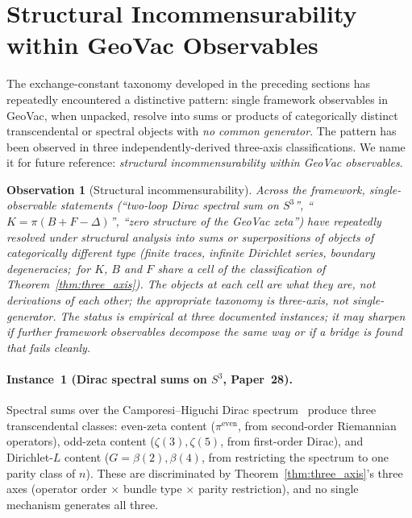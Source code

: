 \documentclass[aps,pra,twocolumn,superscriptaddress,longbibliography]{revtex4-2}
\newtheorem{observation}{Observation}
\begin{document}

\section{Structural Incommensurability within GeoVac Observables}
\label{sec:meta_observation}

The exchange-constant taxonomy developed in the preceding sections
has repeatedly encountered a distinctive pattern: single framework
observables in GeoVac, when unpacked, resolve into sums or
products of categorically distinct transcendental or spectral
objects with \emph{no common generator}.  The pattern has been
observed in three independently-derived three-axis classifications.
We name it for future reference: \emph{structural incommensurability
within GeoVac observables}.

\begin{observation}[Structural incommensurability]
\label{obs:incommensurability}
Across the framework, single-observable statements
(``two-loop Dirac spectral sum on $S^3$'',
``$K = \pi(B + F - \Delta)$'',
``zero structure of the GeoVac zeta'')
have repeatedly resolved under structural analysis into sums or
superpositions of objects of categorically different type (finite
traces, infinite Dirichlet series, boundary degeneracies;\ for $K$,
$B$ and $F$ share a cell of the classification of
Theorem~\ref{thm:three_axis}).  The objects at each cell are what they
are, not derivations of each other; the appropriate taxonomy is
three-axis, not single-generator.  The status is empirical at three
documented instances; it may sharpen if further framework observables
decompose the same way or if a bridge is found that fails cleanly.
\end{observation}

\paragraph{Instance~1 (Dirac spectral sums on $S^3$, Paper~28).}
Spectral sums over the Camporesi--Higuchi Dirac
spectrum~\cite{loutey_paper28} produce three transcendental
classes: even-zeta content ($\pi^{\mathrm{even}}$,
from second-order Riemannian operators), odd-zeta content
($\zeta(3), \zeta(5)$, from first-order Dirac), and Dirichlet-$L$
content ($G = \beta(2), \beta(4)$, from restricting the spectrum to
one parity class of $n$).  These are discriminated by
Theorem~\ref{thm:three_axis}'s three axes
(operator order $\times$ bundle type $\times$ parity restriction), and
no single mechanism generates all three.
\end{document}
